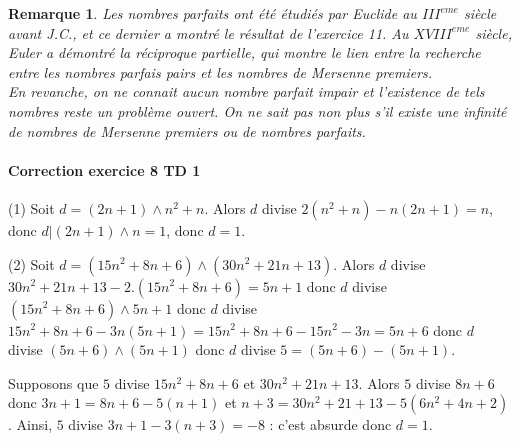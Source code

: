 \documentclass[11pt,a4paper]{article}
\newtheorem*{rem}{Remarque}
\begin{document}
\begin{rem}
Les nombres parfaits ont été étudiés par Euclide au $III^{eme}$ siècle avant J.C., et ce dernier a montré le résultat de l'exercice 11. Au $XVIII^{eme}$ siècle, Euler a démontré la réciproque partielle, qui montre le lien entre la recherche entre les nombres parfais pairs et les nombres de Mersenne premiers. \\
En revanche, on ne connait aucun nombre parfait impair et l'existence de tels nombres reste un problème ouvert. On ne sait pas non plus s'il existe une infinité de nombres de Mersenne premiers ou de nombres parfaits. 
\end{rem}


\paragraph{Correction exercice 8 TD 1}


(1) Soit $d=(2n+1)\wedge n^2+n$. Alors $d$ divise $2(n^2+n)-n(2n+1)=n$, donc $d | (2n+1)\wedge n=1$, donc $d=1$.

(2) Soit $d=(15n^2+8n+6)\wedge (30 n^2+21n+13)$. Alors $d$ divise  $30 n^2+21n+13-2.(15 n^2+8n+6)=5n+1$ donc $d$ divise $(15 n^2+8n+6)\wedge 5n+1$ donc $d$ divise $15 n^2+8n+6-3n(5n+1)=15 n^2+8n+6-15n^2-3n=5n+6$ donc $d$ divise $(5n+6)\wedge(5n+1)$ donc $d$ divise $5=(5n+6)-(5n+1)$.

Supposons que $5$ divise $15n^2+8n+6$ et $30 n^2+21n+13$. Alors $5$ divise $8n+6$ donc $3n+1=8n+6-5(n+1)$ et  $n+3=30n^2+21+13-5(6n^2+4n+2)$. Ainsi, $5$ divise $3n+1-3(n+3)=-8$ : c'est absurde donc $d=1$. 
\end{document}
